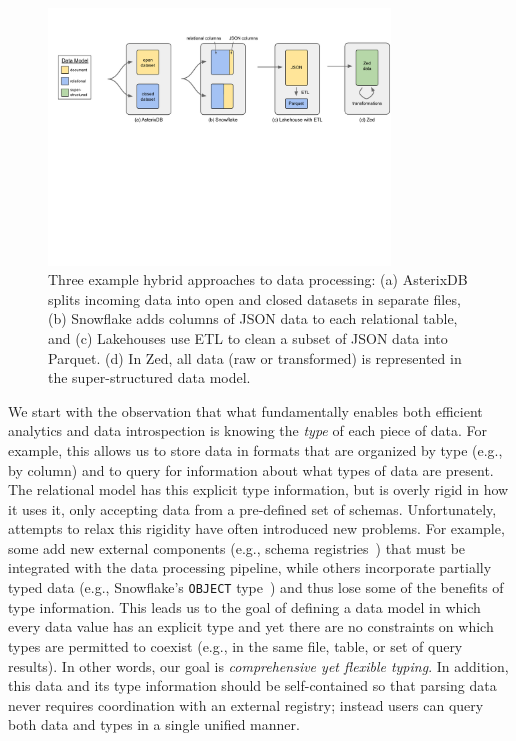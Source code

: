 \begin{figure}[t]
    \centering
    \includegraphics[width=0.81\textwidth]{figures/hybrid_approaches.pdf}
    \vspace{-1.3em}
    \caption{Three example hybrid approaches to data processing: (a) AsterixDB splits incoming data into open and closed datasets in separate files, (b) Snowflake adds columns of JSON data to each relational table, and (c) Lakehouses use ETL to clean a subset of JSON data into Parquet. (d) In Zed, all data (raw or transformed) is represented in the super-structured data model.}
    \label{f:hybrid_approaches}
    \vspace{-1.6em}
\end{figure}

We start with the observation that what fundamentally enables both efficient analytics and data introspection is knowing the {\em type} of each piece of data. For example, this allows us to store data in formats that are organized by type (e.g., by column) and to query for information about what types of data are present. The relational model has this explicit type information, but is overly rigid in how it uses it, only accepting data from a pre-defined set of schemas. 
Unfortunately, attempts to relax this rigidity have often introduced new problems. For example, some add new external components (e.g., schema registries~\cite{confluent_schema_registry}) that must be integrated with the data processing pipeline, while others incorporate partially typed data (e.g., Snowflake's \texttt{OBJECT} type~\cite{snowflake}) and thus lose some of the benefits of type information.
This leads us to the goal of defining a data model in which every data value has an explicit type and yet there are no constraints on which types are permitted to coexist (e.g., in the same file, table, or set of query results). In other words, our goal is {\em comprehensive yet flexible typing}.
In addition, this data and its type information should be self-contained so that parsing data never requires coordination with an external registry; instead users can query both data and types in a single unified manner. 

